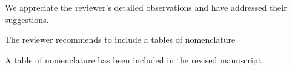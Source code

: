 \documentclass[11pt,answers]{exam}
\begin{document}
\begin{questions}
    \begin{solutionorbox} \label{comment:3_5}
        We appreciate the reviewer’s detailed observations and have addressed their suggestions.
    \end{solutionorbox}


    \question The reviewer recommends to include a tables of nomenclature

    \begin{solutionorbox} \label{comment:3_6}
        A table of nomenclature has been included in the revised manuscript.
    \end{solutionorbox}
\end{questions}


\newpage


\end{document}
